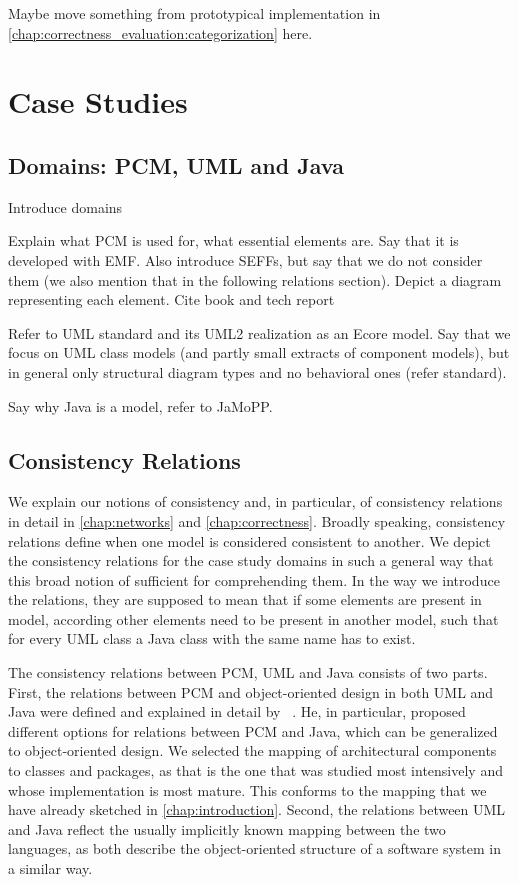 Maybe move something from prototypical implementation in \autoref{chap:correctness_evaluation:categorization} here.


\section{Case Studies}

\subsection{Domains: PCM, UML and Java}
\label{chap:foundations:case_studies:domains}

Introduce domains

Explain what PCM is used for, what essential elements are. Say that it is developed with EMF. Also introduce SEFFs, but say that we do not consider them (we also  mention that in the following relations section).
Depict a diagram representing each element. Cite book and tech report

Refer to UML standard and its UML2 realization as an Ecore model. Say that we focus on UML class models (and partly small extracts of component models), but in general only structural diagram types and no behavioral ones (refer standard).

Say why Java is a model, refer to JaMoPP.


\subsection{Consistency Relations}
\label{chap:foundations:case_studies:relations}

We explain our notions of consistency and, in particular, of consistency relations in detail in \autoref{chap:networks} and \autoref{chap:correctness}.
Broadly speaking, consistency relations define when one model is considered consistent to another.
We depict the consistency relations for the case study domains in such a general way that this broad notion of sufficient for comprehending them.
In the way we introduce the relations, they are supposed to mean that if some elements are present in model, according other elements need to be present in another model, such that for every \gls{UML} class a Java class with the same name has to exist.

The consistency relations between \gls{PCM}, \gls{UML} and Java consists of two parts.
First, the relations between \gls{PCM} and object-oriented design in both \gls{UML} and Java were defined and explained in detail by \citeauthor{langhammer2017a}~\cite{langhammer2015a, langhammer2017a}.
He, in particular, proposed different options for relations between \gls{PCM} and Java, which can be generalized to object-oriented design.
We selected the mapping of architectural components to classes and packages, as that is the one that was studied most intensively and whose implementation is most mature.
This conforms to the mapping that we have already sketched in \autoref{chap:introduction}.
Second, the relations between \gls{UML} and Java reflect the usually implicitly known mapping between the two languages, as both describe the object-oriented structure of a software system in a similar way.

